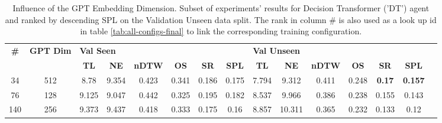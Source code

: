 \begin{table}
\centering
\caption{\label{tab:dt_dim_test}Influence of the GPT Embedding Dimension. Subset of experiments' results for Decision Transformer ('DT') agent and ranked by descending SPL on the Validation Unseen data split. The rank in column \# is also used as a look up id in table \ref{tab:all-configs-final} to link the corresponding training configuration.}
\begin{tabular}{@{\hskip3pt}c@{\hskip3pt}c@{\hskip3pt}c@{\hskip3pt}c@{\hskip3pt}c@{\hskip3pt}c@{\hskip3pt}c@{\hskip3pt}c@{\hskip3pt}c@{\hskip3pt}c@{\hskip3pt}c@{\hskip3pt}c@{\hskip3pt}c@{\hskip3pt}c@{\hskip3pt}c}
\toprule
\textbf{\#} & \textbf{GPT Dim} & \multicolumn{6}{l}{\textbf{Val Seen}} & \multicolumn{6}{l}{\textbf{Val Unseen}} \\
 \textbf{~} &       \textbf{~} &       \textbf{TL} & \textbf{NE} & \textbf{nDTW} & \textbf{OS} & \textbf{SR} & \textbf{SPL} &         \textbf{TL} & \textbf{NE} & \textbf{nDTW} & \textbf{OS} &    \textbf{SR} &    \textbf{SPL} \\
\midrule
         34 &              512 &              8.78 &       9.354 &         0.423 &       0.341 &       0.186 &        0.175 &               7.794 &       9.312 &         0.411 &       0.248 &  \textbf{0.17} &  \textbf{0.157} \\
         76 &              128 &             9.125 &       9.047 &         0.442 &       0.325 &       0.195 &        0.182 &               8.537 &       9.966 &         0.386 &       0.238 &          0.155 &           0.143 \\
        140 &              256 &             9.373 &       9.437 &         0.418 &       0.333 &       0.175 &         0.16 &               8.857 &      10.311 &         0.365 &       0.232 &          0.133 &            0.12 \\
\bottomrule
\end{tabular}
\end{table}
